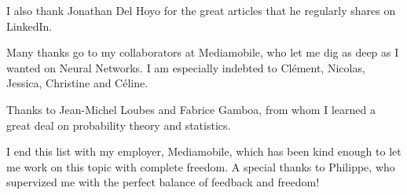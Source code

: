 I also thank Jonathan Del Hoyo for the great articles that he regularly shares on LinkedIn.

\vspace{0.2cm}

Many thanks go to my collaborators at Mediamobile, who let me dig as deep as I wanted on Neural Networks. I am especially indebted to Clément, Nicolas, Jessica, Christine and Céline. 

\vspace{0.2cm}

Thanks to Jean-Michel Loubes and Fabrice Gamboa, from whom I learned a great deal on probability theory and statistics.

\vspace{0.2cm}

I end this list with my employer, Mediamobile, which has been kind enough to let me work on this topic with complete freedom. A special thanks to Philippe, who supervized me with the perfect balance of feedback and freedom! 

